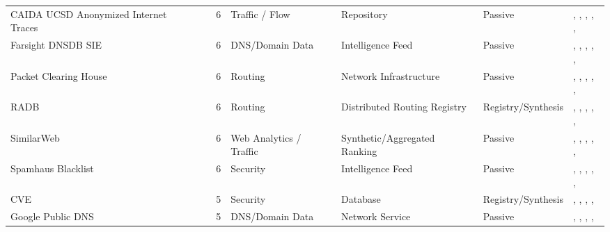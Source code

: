 \documentclass[11pt,a4paper]{article}
\begin{document}
\begin{longtable}{@{}p{}p{}p{}p{}p{}p{}p{}@{}}
CAIDA UCSD Anonymized Internet Traces & \cite{caidaait} & 6 & Traffic / Flow & Repository & Passive & \cite{10.1145/3730567.3764459}, \cite{10.1145/3730567.3764487}, \cite{10.1145/3646547.3689011}, \cite{10.1145/3646547.3689016}, \cite{10.1145/3487552.3487856}, \cite{10.1007/978-3-030-72582-2_32} \\
Farsight DNSDB SIE & \cite{dnsdb} & 6 & DNS/Domain Data & Intelligence Feed & Passive & \cite{10.1145/3618257.3624805}, \cite{10.1007/978-3-030-98785-5_2}, \cite{10.1145/3517745.3561431}, \cite{10.1007/978-3-031-28486-1_10}, \cite{10.1007/978-3-031-28486-1_22}, \cite{10.1145/3777912.3809146} \\
Packet Clearing House & \cite{pch-data} & 6 & Routing & Network Infrastructure & Passive & \cite{10.1145/3517745.3561443}, \cite{10.1145/3487552.3487865}, \cite{10.1007/978-3-030-98785-5_10}, \cite{10.1007/978-3-030-98785-5_16}, \cite{10.1007/978-3-031-56252-5_5}, \cite{10.1145/3777912.3839829} \\
RADB & \cite{radb} & 6 & Routing & Distributed Routing Registry & Registry/Synthesis & \cite{10.1145/3618257.3624812}, \cite{10.1145/3517745.3561454}, \cite{10.1007/978-3-030-72582-2_14}, \cite{10.1007/978-3-030-98785-5_10}, \cite{10.1007/978-3-030-98785-5_14}, \cite{10.1007/978-3-032-18268-5_2} \\
SimilarWeb & \cite{similarweb} & 6 & Web Analytics / Traffic & Synthetic/Aggregated Ranking & Passive & \cite{10.1145/3646547.3688427}, \cite{10.1145/3517745.3561416}, \cite{10.1007/978-3-030-72582-2_33}, \cite{10.1007/978-3-030-98785-5_19}, \cite{10.1007/978-3-031-28486-1_1}, \cite{10.1145/3777912.3839787} \\
Spamhaus Blacklist & \cite{spamhaus_blocklist} & 6 & Security & Intelligence Feed & Passive & \cite{10.1145/3646547.3689010}, \cite{10.1145/3517745.3561454}, \cite{10.1145/3487552.3487838}, \cite{10.1007/978-3-030-98785-5_2}, \cite{10.1007/978-3-031-56249-5_9}, \cite{10.1145/3777912.3839787} \\
CVE & \cite{cve_mitre} & 5 & Security & Database & Registry/Synthesis & \cite{10.1145/3618257.3624804}, \cite{10.1145/3618257.3624810}, \cite{10.1145/3487552.3487833}, \cite{10.1007/978-3-030-72582-2_5}, \cite{10.1007/978-3-032-18268-5_16} \\
Google Public DNS & \cite{google-public-dns} & 5 & DNS/Domain Data & Network Service & Passive & \cite{10.1145/3487552.3487844}, \cite{10.1007/978-3-031-28486-1_24}, \cite{10.1007/978-3-031-85960-1_3}, \cite{10.1145/3777912.3839811}, \cite{10.1145/3777912.3839830} \\

\end{longtable}
\end{document}
